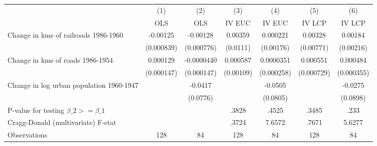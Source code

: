 {
\def\sym#1{\ifmmode^{#1}\else\(^{#1}\)\fi}
\begin{tabular}{l*{6}{c}}
\hline\hline
                &\multicolumn{1}{c}{(1)}&\multicolumn{1}{c}{(2)}&\multicolumn{1}{c}{(3)}&\multicolumn{1}{c}{(4)}&\multicolumn{1}{c}{(5)}&\multicolumn{1}{c}{(6)}\\
                &\multicolumn{1}{c}{OLS}&\multicolumn{1}{c}{OLS}&\multicolumn{1}{c}{IV EUC}&\multicolumn{1}{c}{IV EUC}&\multicolumn{1}{c}{IV LCP}&\multicolumn{1}{c}{IV LCP}\\
\hline
Change in kms of railroads 1986-1960& -0.00125         & -0.00128         &  0.00359         & 0.000221         &  0.00328         &  0.00184         \\
                &(0.000839)         &(0.000776)         & (0.0111)         &(0.00176)         &(0.00771)         &(0.00216)         \\
[1em]
Change in kms of roads 1986-1954& 0.000129         &-0.0000440         & 0.000587         &0.0000351         & 0.000551         & 0.000484         \\
                &(0.000147)         &(0.000147)         &(0.00109)         &(0.000258)         &(0.000729)         &(0.000355)         \\
[1em]
Change in log urban population 1960-1947&                  &  -0.0417         &                  &  -0.0505         &                  &  -0.0275         \\
                &                  & (0.0776)         &                  & (0.0805)         &                  & (0.0898)         \\
\hline
P-value for testing $\beta\_{2} >= \beta\_{1}$&                  &                  &    .3828         &    .4525         &    .3485         &     .233         \\
Cragg-Donald (multivariate) F-stat&                  &                  &    .3724         &   7.6572         &    .7671         &   5.6277         \\
Observations    &      128         &       84         &      128         &       84         &      128         &       84         \\
\hline\hline
\end{tabular}
}
